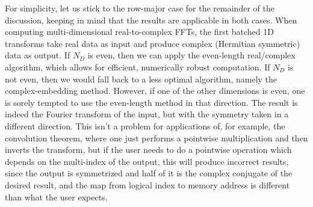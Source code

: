 \documentclass[12pt]{article}
\begin{document}
For simplicity, let us stick to the row-major case for the remainder
of the discussion, keeping in mind that the results are applicable in
both cases.  When computing multi-dimensional real-to-complex FFTs,
the first batched 1D transforms take real data as input and produce
complex (Hermitian symmetric) data as output.  If $N_D$ is even, then
we can apply the even-length real/complex algorithm, which allows for
efficient, numerically robust computation.  If $N_D$ is not even, then
we would fall back to a less optimal algorithm, namely the
complex-embedding method.  However, if one of the other dimensions is
even, one is sorely tempted to use the even-length method in that
direction.  The result is indeed the Fourier transform of the input,
but with the symmetry taken in a different direction.  This isn't a
problem for applications of, for example, the convolution theorem,
where one just performs a pointwise multiplication and then inverts
the transform, but if the user needs to do a pointwise operation which
depends on the multi-index of the output, this will produce incorrect
results, since the output is symmetrized and half of it is the complex
conjugate of the desired result, and the map from logical index to
memory address is different than what the user expects.
\end{document}
